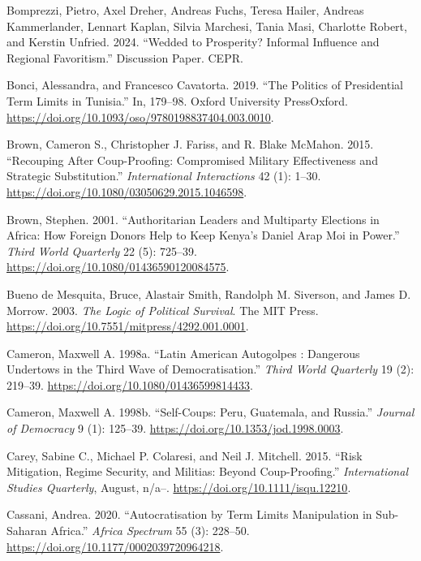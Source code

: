 \documentclass[
  12pt,
]{report}
\newlength{\cslhangindent}
\newenvironment{CSLReferences}[2] %
 {\begin{list}{}{%
  \setlength{\itemindent}{0pt}
  \setlength{\leftmargin}{0pt}
  \setlength{\parsep}{0pt}
  \ifodd #1
   \setlength{\leftmargin}{\cslhangindent}
   \setlength{\itemindent}{-1\cslhangindent}
  \fi
  \setlength{\itemsep}{#2\baselineskip}}}
 {\end{list}}
\begin{document}
\begin{CSLReferences}{1}{0}
Bomprezzi, Pietro, Axel Dreher, Andreas Fuchs, Teresa Hailer, Andreas
Kammerlander, Lennart Kaplan, Silvia Marchesi, Tania Masi, Charlotte
Robert, and Kerstin Unfried. 2024. {``Wedded to Prosperity? Informal
Influence and Regional Favoritism.''} Discussion Paper. CEPR.

Bonci, Alessandra, and Francesco Cavatorta. 2019. {``The Politics of
Presidential Term Limits in Tunisia.''} In, 179--98. Oxford University
PressOxford. \url{https://doi.org/10.1093/oso/9780198837404.003.0010}.

Brown, Cameron S., Christopher J. Fariss, and R. Blake McMahon. 2015.
{``Recouping After Coup-Proofing: Compromised Military Effectiveness and
Strategic Substitution.''} \emph{International Interactions} 42 (1):
1--30. \url{https://doi.org/10.1080/03050629.2015.1046598}.

Brown, Stephen. 2001. {``Authoritarian Leaders and Multiparty Elections
in Africa: How Foreign Donors Help to Keep Kenya's Daniel Arap Moi in
Power.''} \emph{Third World Quarterly} 22 (5): 725--39.
\url{https://doi.org/10.1080/01436590120084575}.

Bueno de Mesquita, Bruce, Alastair Smith, Randolph M. Siverson, and
James D. Morrow. 2003. \emph{The Logic of Political Survival}. The MIT
Press. \url{https://doi.org/10.7551/mitpress/4292.001.0001}.

Cameron, Maxwell A. 1998a. {``Latin American Autogolpes : Dangerous
Undertows in the Third Wave of Democratisation.''} \emph{Third World
Quarterly} 19 (2): 219--39.
\url{https://doi.org/10.1080/01436599814433}.

Cameron, Maxwell A. 1998b. {``Self-Coups: Peru, Guatemala, and
Russia.''} \emph{Journal of Democracy} 9 (1): 125--39.
\url{https://doi.org/10.1353/jod.1998.0003}.

Carey, Sabine C., Michael P. Colaresi, and Neil J. Mitchell. 2015.
{``Risk Mitigation, Regime Security, and Militias: Beyond
Coup-Proofing.''} \emph{International Studies Quarterly}, August, n/a--.
\url{https://doi.org/10.1111/isqu.12210}.

Cassani, Andrea. 2020. {``Autocratisation by Term Limits Manipulation in
Sub-Saharan Africa.''} \emph{Africa Spectrum} 55 (3): 228--50.
\url{https://doi.org/10.1177/0002039720964218}.


\end{CSLReferences}
\end{document}

